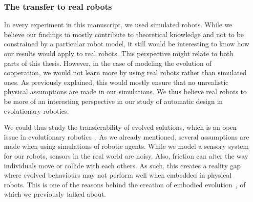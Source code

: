 		\subsubsection{The transfer to real robots}

			In every experiment in this manuscript, we used simulated robots. While we believe our findings to mostly contribute to theoretical knowledge and not to be constrained by a particular robot model, it still would be interesting to know how our results would apply to real robots. This perspective might relate to both parts of this thesis. However, in the case of modeling the evolution of cooperation, we would not learn more by using real robots rather than simulated ones. As previously explained, this would mostly ensure that no unrealistic physical assumptions are made in our simulations. We thus believe real robots to be more of an interesting perspective in our study of automatic design in evolutionary robotics.

			We could thus study the transferability of evolved solutions, which is an open issue in evolutionary robotics~\parencite{Mouret2012b, Doncieux2015a}. As we already mentioned, several assumptions are made when using simulations of robotic agents. While we model a sensory system for our robots, sensors in the real world are noisy. Also, friction can alter the way individuals move or collide with each others. As such, this creates a reality gap where evolved behaviours may not perform well when embedded in physical robots. This is one of the reasons behind the creation of embodied evolution~\parencite{Watson2002}, of which we previously talked about.

